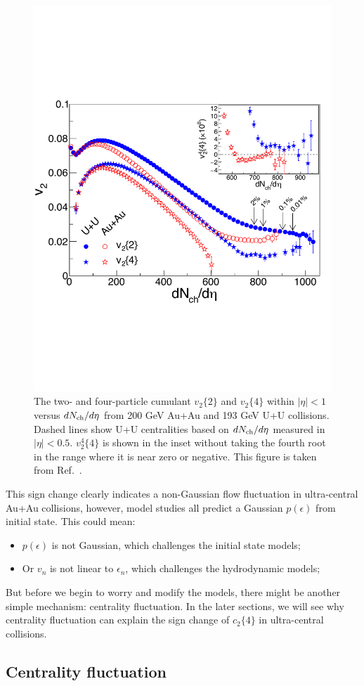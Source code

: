 \begin{figure}[H]
\centering
\includegraphics[width=.6\linewidth]{figs/chapter_centfluc/STAR_AuAu_centfluc.pdf}
\caption{The two- and four-particle cumulant $v_2\{2\}$ and $v_2\{4\}$ within $|\eta|<1$ versus $dN_\text{ch}/d\eta$ from 200 GeV Au+Au and 193 GeV U+U collisions. Dashed lines show U+U centralities based on $dN_\text{ch}/d\eta$ measured in $|\eta|<0.5$. $v_2^4\{4\}$ is shown in the inset without taking the fourth root in the range where it is near zero or negative. This figure is taken from Ref.~\cite{Adamczyk:2015obl}.}
\label{fig:centfluc_STAR_AuAu_centfluc}
\end{figure}

This sign change clearly indicates a non-Gaussian flow fluctuation in ultra-central Au+Au collisions, however, model studies all predict a Gaussian $p(\epsilon)$ from initial state. This could mean:
\begin{itemize}
\item $p(\epsilon)$ is not Gaussian, which challenges the initial state models;
\item Or $v_n$ is not linear to $\epsilon_n$, which challenges the hydrodynamic models;
\end{itemize}
But before we begin to worry and modify the models, there might be another simple mechanism: centrality fluctuation. In the later sections, we will see why centrality fluctuation can explain the sign change of $c_2\{4\}$ in ultra-central collisions.



\subsection{Centrality fluctuation}

